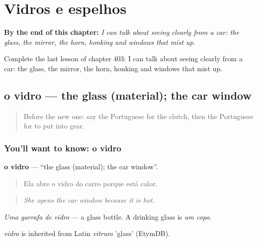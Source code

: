 
\chapter{Vidros e espelhos}
\label{ch:pt-vidros-e-espelhos}

\begin{chapteropening}
\textbf{By the end of this chapter:} \emph{I can talk about seeing clearly from a car: the glass, the mirror, the horn, honking and windows that mist up.}

Complete the last lesson of chapter 403: I can talk about seeing clearly from a car: the glass, the mirror, the horn, honking and windows that mist up.
\end{chapteropening}

\section[o vidro]{o vidro — the glass (material); the car window}

\label{lesson:PT-C403-vidro}



\begin{quote}
Before the new one: say the Portuguese for the clutch, then the Portuguese for to put into gear.
\end{quote}

\subsection*{You'll want to know: o vidro}
\textbf{o vidro} — \textquotedblleft{}the glass (material); the car window\textquotedblright{}.

\begin{quote}
Ela abre o vidro do carro porque está calor.
\end{quote}

\begin{quote}
\emph{She opens the car window because it is hot.}
\end{quote}

\emph{Uma garrafa de vidro} — a glass bottle. A drinking glass is \emph{um copo}.

\begin{cousinweb}
\emph{vidro} is inherited from Latin \emph{vitrum} 'glass' (EtymDB).
\end{cousinweb}


